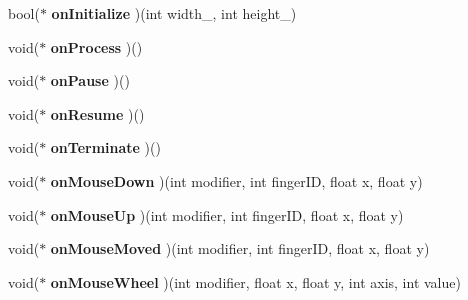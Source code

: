 \begin{DoxyCompactItemize}
\item 
bool($\ast$ {\bfseries on\+Initialize} )(int width\+\_\+, int height\+\_\+)\hypertarget{class_magnum_1_1_game_descriptor_ab213c28ce93444fb1eb3c5c9e8205b7d}{}\label{class_magnum_1_1_game_descriptor_ab213c28ce93444fb1eb3c5c9e8205b7d}

\item 
void($\ast$ {\bfseries on\+Process} )()\hypertarget{class_magnum_1_1_game_descriptor_a83c1d40fe7eb054e40991efb3d8dfba9}{}\label{class_magnum_1_1_game_descriptor_a83c1d40fe7eb054e40991efb3d8dfba9}

\item 
void($\ast$ {\bfseries on\+Pause} )()\hypertarget{class_magnum_1_1_game_descriptor_ade7f73b0e161788095feef3a5cc273af}{}\label{class_magnum_1_1_game_descriptor_ade7f73b0e161788095feef3a5cc273af}

\item 
void($\ast$ {\bfseries on\+Resume} )()\hypertarget{class_magnum_1_1_game_descriptor_a97c5e3c0de8e7e8bab114f7bfeb10e7b}{}\label{class_magnum_1_1_game_descriptor_a97c5e3c0de8e7e8bab114f7bfeb10e7b}

\item 
void($\ast$ {\bfseries on\+Terminate} )()\hypertarget{class_magnum_1_1_game_descriptor_abfb2efbdc8d4637880a2cc0207aefe50}{}\label{class_magnum_1_1_game_descriptor_abfb2efbdc8d4637880a2cc0207aefe50}

\item 
void($\ast$ {\bfseries on\+Mouse\+Down} )(int modifier, int finger\+ID, float x, float y)\hypertarget{class_magnum_1_1_game_descriptor_a9a82d6b7ad59a7dc9c7dd8b36a0463a6}{}\label{class_magnum_1_1_game_descriptor_a9a82d6b7ad59a7dc9c7dd8b36a0463a6}

\item 
void($\ast$ {\bfseries on\+Mouse\+Up} )(int modifier, int finger\+ID, float x, float y)\hypertarget{class_magnum_1_1_game_descriptor_a7f5945d1358abbd75e643217add84935}{}\label{class_magnum_1_1_game_descriptor_a7f5945d1358abbd75e643217add84935}

\item 
void($\ast$ {\bfseries on\+Mouse\+Moved} )(int modifier, int finger\+ID, float x, float y)\hypertarget{class_magnum_1_1_game_descriptor_a069a132eda1948ea947a57321a574998}{}\label{class_magnum_1_1_game_descriptor_a069a132eda1948ea947a57321a574998}

\item 
void($\ast$ {\bfseries on\+Mouse\+Wheel} )(int modifier, float x, float y, int axis, int value)\hypertarget{class_magnum_1_1_game_descriptor_acfe83ea8c1fda3458129eb97b83df1d0}{}\label{class_magnum_1_1_game_descriptor_acfe83ea8c1fda3458129eb97b83df1d0}


\end{DoxyCompactItemize}
